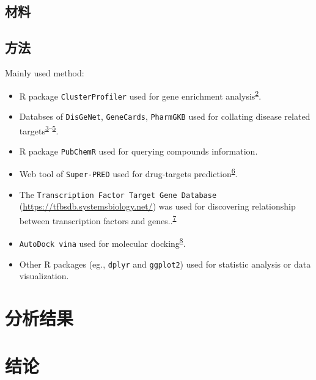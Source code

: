 \documentclass[
]{article}
\providecommand{\tightlist}{%
  \setlength{\itemsep}{0pt}\setlength{\parskip}{0pt}}
\begin{document}
\hypertarget{ux6750ux6599}{%
\subsection{材料}\label{ux6750ux6599}}

\hypertarget{ux65b9ux6cd5}{%
\subsection{方法}\label{ux65b9ux6cd5}}

Mainly used method:

\begin{itemize}
\tightlist
\item
  R package \texttt{ClusterProfiler} used for gene enrichment analysis\textsuperscript{\protect\hyperlink{ref-ClusterprofilerWuTi2021}{2}}.
\item
  Databses of \texttt{DisGeNet}, \texttt{GeneCards}, \texttt{PharmGKB} used for collating disease related targets\textsuperscript{\protect\hyperlink{ref-TheDisgenetKnPinero2019}{3}--\protect\hyperlink{ref-PharmgkbAWorBarbar2018}{5}}.
\item
  R package \texttt{PubChemR} used for querying compounds information.
\item
  Web tool of \texttt{Super-PRED} used for drug-targets prediction\textsuperscript{\protect\hyperlink{ref-SuperpredUpdaNickel2014}{6}}.
\item
  The \texttt{Transcription\ Factor\ Target\ Gene\ Database} (\url{https://tfbsdb.systemsbiology.net/}) was used for discovering relationship between transcription factors and genes..\textsuperscript{\protect\hyperlink{ref-CausalMechanisPlaisi2016}{7}}
\item
  \texttt{AutoDock\ vina} used for molecular docking\textsuperscript{\protect\hyperlink{ref-AutodockVina1Eberha2021}{8}}.
\item
  Other R packages (eg., \texttt{dplyr} and \texttt{ggplot2}) used for statistic analysis or data visualization.
\end{itemize}

\hypertarget{results}{%
\section{分析结果}\label{results}}

\hypertarget{dis}{%
\section{结论}\label{dis}}
\end{document}
